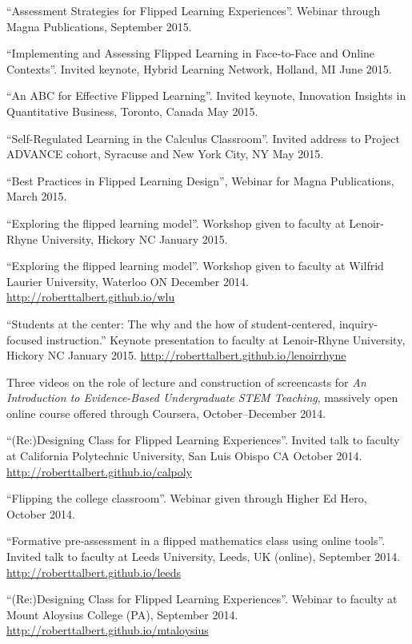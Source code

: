 \documentclass[letterpaper]{article}
\renewenvironment{itemize}{
  \begin{list}{}{
    \setlength{\leftmargin}{1.5em}
	\setlength{\itemsep}{0in}
  }
}{
  \end{list}
}
\begin{document}
\begin{itemize}
	\item ``Assessment Strategies for Flipped Learning Experiences''. Webinar through Magna Publications, September 2015.
	\item ``Implementing and Assessing Flipped Learning in Face-to-Face and Online Contexts''. Invited keynote, Hybrid Learning Network, Holland, MI June 2015.
	\item ``An ABC for Effective Flipped Learning''. Invited keynote, Innovation Insights in Quantitative Business, Toronto, Canada May 2015.
	\item ``Self-Regulated Learning in the Calculus Classroom''. Invited address to Project ADVANCE cohort, Syracuse and New York City, NY May 2015.
	\item ``Best Practices in Flipped Learning Design'', Webinar for Magna Publications, March 2015.
	\item ``Exploring the flipped learning model''. Workshop given to faculty at Lenoir-Rhyne University, Hickory NC January 2015.
	\item ``Exploring the flipped learning model''. Workshop given to faculty at Wilfrid Laurier University, Waterloo ON December 2014. \url{http://roberttalbert.github.io/wlu}
	\item ``Students at the center: The why and the how of student-centered, inquiry-focused instruction.'' Keynote presentation to faculty at Lenoir-Rhyne University, Hickory NC January 2015. \url{http://roberttalbert.github.io/lenoirrhyne}
	\item Three videos on the role of lecture and construction of screencasts for \emph{An Introduction to Evidence-Based Undergraduate STEM Teaching}, massively open online course offered through Coursera, October--December 2014.
	\item ``(Re:)Designing Class for Flipped Learning Experiences''. Invited talk to faculty at California Polytechnic University, San Luis Obispo CA October 2014. \url{http://roberttalbert.github.io/calpoly}
	\item ``Flipping the college classroom''. Webinar given through Higher Ed Hero, October 2014.
	\item ``Formative pre-assessment in a flipped mathematics class using online tools''. Invited talk to faculty at Leeds University, Leeds, UK (online), September 2014. \url{http://roberttalbert.github.io/leeds}
	\item ``(Re:)Designing Class for Flipped Learning Experiences''. Webinar to faculty at Mount Aloysius College (PA), September 2014. \url{http://roberttalbert.github.io/mtaloysius}

\end{itemize}
\end{document}
